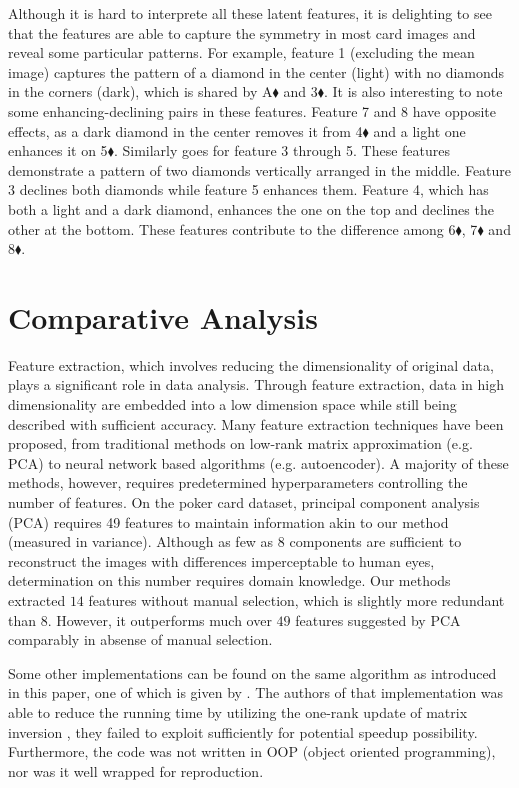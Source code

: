 \documentclass{article}
\begin{document}
Although it is hard to interprete all these latent features, it is delighting to see that the features are able to capture the symmetry in most card images and reveal some particular patterns. For example, feature 1 (excluding the mean image) captures the pattern of a diamond in the center (light) with no diamonds in the corners (dark), which is shared by A$\blacklozenge$ and 3$\blacklozenge$. It is also interesting to note some enhancing-declining pairs in these features. Feature 7 and 8 have opposite effects, as a dark diamond in the center removes it from 4$\blacklozenge$ and a light one enhances it on 5$\blacklozenge$. Similarly goes for feature 3 through 5. These features demonstrate a pattern of two diamonds vertically arranged in the middle. Feature 3 declines both diamonds while feature 5 enhances them. Feature 4, which has both a light and a dark diamond, enhances the one on the top and declines the other at the bottom. These features contribute to the difference among 6$\blacklozenge$, 7$\blacklozenge$ and 8$\blacklozenge$.



\section{Comparative Analysis}\label{sec::comparison}
Feature extraction, which involves reducing the dimensionality of original data, plays a significant role in data analysis. Through feature extraction, data in high dimensionality are embedded into a low dimension space while still being described with sufficient accuracy. Many feature extraction techniques have been proposed, from traditional methods on low-rank matrix approximation (e.g. PCA) to neural network based algorithms (e.g. autoencoder). A majority of these methods, however, requires predetermined hyperparameters controlling the number of features. On the poker card dataset, principal component analysis (PCA) requires 49 features to maintain information akin to our method (measured in variance). Although as few as $8$ components are sufficient to reconstruct the images with differences imperceptable to human eyes, determination on this number requires domain knowledge. Our methods extracted $14$ features without manual selection, which is slightly more redundant than $8$. However, it outperforms much over $49$ features suggested by PCA comparably in absense of manual selection.

Some other implementations can be found on the same algorithm as introduced in this paper, one of which is given by \citet{chai}. The authors of that implementation was able to reduce the running time by utilizing the one-rank update of matrix inversion \citep{griffiths2005infinite}, they failed to exploit sufficiently for potential speedup possibility. Furthermore, the code was not written in OOP (object oriented programming), nor was it well wrapped for reproduction.
\end{document}
